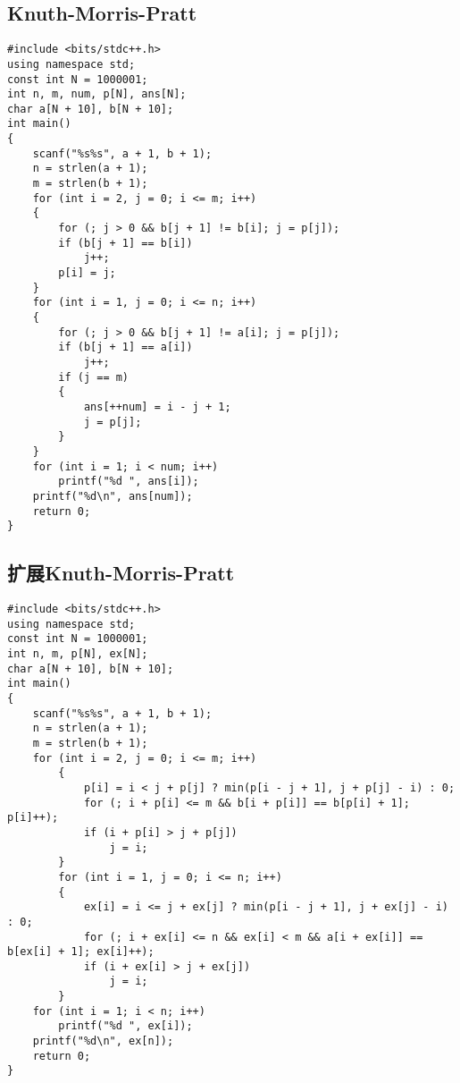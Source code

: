 \documentclass[a4paper]{article}
\begin{document}
\subsection{Knuth-Morris-Pratt}
\begin{lstlisting}
#include <bits/stdc++.h>
using namespace std;
const int N = 1000001;
int n, m, num, p[N], ans[N];
char a[N + 10], b[N + 10];
int main()
{
    scanf("%s%s", a + 1, b + 1);
    n = strlen(a + 1);
    m = strlen(b + 1);
    for (int i = 2, j = 0; i <= m; i++)
    {
        for (; j > 0 && b[j + 1] != b[i]; j = p[j]);
        if (b[j + 1] == b[i])
            j++;
        p[i] = j;
    }
    for (int i = 1, j = 0; i <= n; i++)
    {
        for (; j > 0 && b[j + 1] != a[i]; j = p[j]);
        if (b[j + 1] == a[i])
            j++;
        if (j == m)
        {
            ans[++num] = i - j + 1;
            j = p[j];
        }
    }
    for (int i = 1; i < num; i++)
        printf("%d ", ans[i]);
    printf("%d\n", ans[num]);
    return 0;
}
\end{lstlisting}
\subsection{扩展Knuth-Morris-Pratt}
\begin{lstlisting}
#include <bits/stdc++.h>
using namespace std;
const int N = 1000001;
int n, m, p[N], ex[N];
char a[N + 10], b[N + 10];
int main()
{
    scanf("%s%s", a + 1, b + 1);
    n = strlen(a + 1);
    m = strlen(b + 1);
    for (int i = 2, j = 0; i <= m; i++)
        {
            p[i] = i < j + p[j] ? min(p[i - j + 1], j + p[j] - i) : 0;
            for (; i + p[i] <= m && b[i + p[i]] == b[p[i] + 1]; p[i]++);
            if (i + p[i] > j + p[j])
                j = i;
        }
        for (int i = 1, j = 0; i <= n; i++)
        {
            ex[i] = i <= j + ex[j] ? min(p[i - j + 1], j + ex[j] - i) : 0;
            for (; i + ex[i] <= n && ex[i] < m && a[i + ex[i]] == b[ex[i] + 1]; ex[i]++);
            if (i + ex[i] > j + ex[j])
                j = i;
        }
    for (int i = 1; i < n; i++)
        printf("%d ", ex[i]);
    printf("%d\n", ex[n]);
    return 0;
}
\end{lstlisting}
\end{document}
